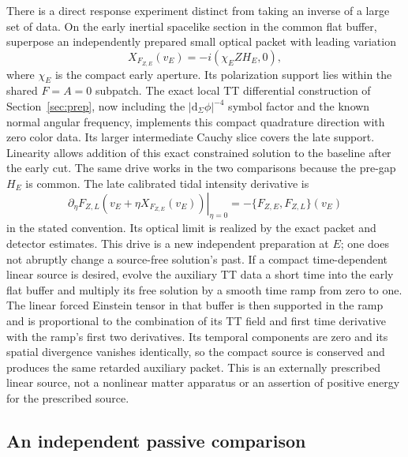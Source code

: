 \documentclass[11pt]{article}
\newcommand{\dd}{\mathrm d}
\begin{document}
There is a direct response experiment distinct from
taking an inverse of a large set of data. On the early
inertial spacelike section in the common flat buffer,
superpose an independently prepared small optical
packet with leading variation
\[
 X_{F_{Z,E}}(v_E)=-i(\chi_E ZH_E,0),
\]
where \(\chi_E\) is the compact early aperture. Its
polarization support lies within the shared \(F=A=0\)
subpatch. The exact local TT differential construction
of Section~\ref{sec:prep}, now including the
\(|\dd_\Sigma\phi|^{-4}\) symbol factor and the known
normal angular frequency, implements this compact
quadrature direction with zero color data. Its larger
intermediate Cauchy slice covers the late support.
Linearity allows addition of this exact constrained
solution to the baseline after the early cut. The same
drive works in the two comparisons because the
pre-gap \(H_E\) is common. The late calibrated
tidal intensity derivative is
\[
 \left.\partial_\eta
       F_{Z,L}(v_E+\eta X_{F_{Z,E}}(v_E))\right|_{\eta=0}
       =-\{F_{Z,E},F_{Z,L}\}(v_E)
\]
in the stated convention. Its optical limit is realized
by the exact packet and detector estimates.
This drive is a new independent preparation at \(E\);
one does not abruptly change a source-free solution's
past. If a compact time-dependent linear source is
desired, evolve the auxiliary TT data a short time
into the early flat buffer and multiply its free
solution by a smooth time ramp from zero to one.
The linear forced Einstein tensor in that buffer is
then supported in the ramp and is proportional to
the combination of its TT field and first time
derivative with the ramp's first two derivatives.
Its temporal components are zero and its spatial
divergence vanishes identically, so the compact
source is conserved and produces the same
retarded auxiliary packet. This is an externally
prescribed linear source, not a nonlinear matter
apparatus or an assertion of positive energy for
the prescribed source.

\subsection{An independent passive comparison}
\end{document}

